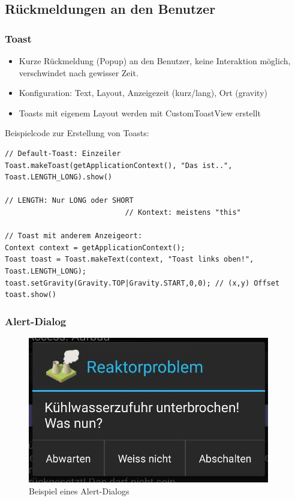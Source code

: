 \documentclass[a4paper]{article}
\begin{document}
\newpage

\subsection{Rückmeldungen an den Benutzer}

\subsubsection{Toast}

\begin{itemize}
	\item Kurze Rückmeldung (Popup) an den Benutzer, keine Interaktion möglich, verschwindet nach gewisser Zeit.
	\item Konfiguration: Text, Layout, Anzeigezeit (kurz/lang), Ort (gravity)
	\item Toasts mit eigenem Layout werden mit CustomToastView erstellt
\end{itemize}
\vspace{1em}
Beispielcode zur Erstellung von Toasts:

\begin{lstlisting}
// Default-Toast: Einzeiler
Toast.makeToast(getApplicationContext(), "Das ist..", Toast.LENGTH_LONG).show()
																						// LENGTH: Nur LONG oder SHORT
							// Kontext: meistens "this"
							
// Toast mit anderem Anzeigeort:
Context context = getApplicationContext();
Toast toast = Toast.makeText(context, "Toast links oben!", Toast.LENGTH_LONG);
toast.setGravity(Gravity.TOP|Gravity.START,0,0); // (x,y) Offset
toast.show()
\end{lstlisting}

\subsubsection{Alert-Dialog}

\begin{figure}[htb!]
	\centering
	\includegraphics[width=.35\textwidth]{img/alert_dialog.jpg}
	\caption{Beispiel eines Alert-Dialogs}
\end{figure}
\end{document}
